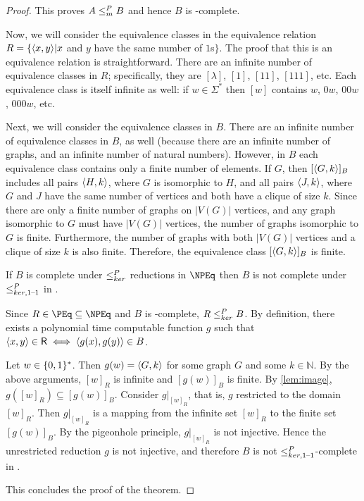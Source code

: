 \begin{proof}
  This proves $A\leq^{P}_{m} B$ and hence $B$ is \NP-complete.

  Now, we will consider the equivalence classes in the equivalence relation $R=\{\langle x,y\rangle|x$ and $y$ have the same number of $1$s$\}$.
  The proof that this is an equivalence relation is straightforward.
  There are an infinite number of equivalence classes in $R$; specifically, they are $[\lambda]$, $[1]$, $[11]$, $[111]$, etc.
  Each equivalence class is itself infinite as well: if $w\in\Sigma^*$ then $[w]$ contains $w$, $0w$, $00w$, $000w$, etc.

  Next, we will consider the equivalence classes in $B$.
  There are an infinite number of equivalence classes in $B$, as well (because there are an infinite number of graphs, and an infinite number of natural numbers).
  However, in $B$ each equivalence class contains only a finite number of elements.
  If $G$, then $[\langle G,k\rangle]_B$ includes all pairs $\langle H,k\rangle$, where $G$ is isomorphic to $H$, and all pairs $\langle J,k\rangle$, where $G$ and $J$ have the same number of vertices and both have a clique of size $k$.
  Since there are only a finite number of graphs on $|V(G)|$ vertices, and any graph isomorphic to $G$ must have $|V(G)|$ vertices, the number of graphs isomorphic to $G$ is finite.
  Furthermore, the number of graphs with both $|V(G)|$ vertices and a clique of size $k$ is also finite.
  Therefore, the equivalence class $[\langle G,k\rangle]_B$ is finite.

  \begin{claim}
    If $B$ is complete under $\leq^{P}_{ker}$ reductions in $\NPEq$ then $B$ is not complete under $\leq^{P}_{ker,1\text{--}1}$ in \NPEq.
  \end{claim}
  Since $R\in\PEq\subseteq\NPEq$ and $B$ is \NPEq-complete, $R\leq^{P}_{ker} B$.
  By definition, there exists a polynomial time computable function $g$ such that $\langle x,y\rangle\in{\ensuremath{\mathsf{R}}}\iff \langle g(x),g(y)\rangle\in B$.

  Let $w\in\{0, 1\}^{*}$.
  Then $g(w)=\langle G,k\rangle$ for some graph $G$ and some $k\in\mathbb{N}$.
  By the above arguments, $[w]_R$ is infinite and $[g(w)]_B$ is finite.
  By \autoref{lem:image}, $g([w]_R)\subseteq [g(w)]_B$.
  Consider $g|_{[w]_R}$, that is, $g$ restricted to the domain $[w]_R$.
  Then $g|_{[w]_R}$ is a mapping from the infinite set $[w]_R$ to the finite set $[g(w)]_B$.
  By the pigeonhole principle, $g|_{[w]_R}$ is not injective.
  Hence the unrestricted reduction $g$ is not injective, and therefore $B$ is not $\leq^{P}_{ker,1\text{--}1}$-complete in \NPEq.

  This concludes the proof of the theorem.
\end{proof}
